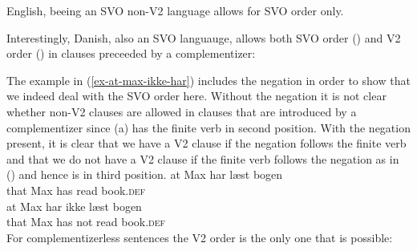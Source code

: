 
English, beeing an SVO non-V2 language allows for SVO order only.
\z

Interestingly, Danish, also an SVO languauge, allows both SVO order () and V2 order () in clauses
preceeded by a complementizer:
\z

\eal
{}
\zl
The example in (\ref{ex-at-max-ikke-har}) includes the negation in order to show that we indeed deal
with the SVO order here. Without the negation it is not clear whether non-V2 clauses are allowed in
clauses that are introduced by a complementizer since (a) has the finite verb in second
position. With the negation present, it is clear that we have a V2 clause if the negation follows
the finite verb and that we do not have a V2 clause if the finite verb follows the negation as in
() and hence is in third position.
\eal
\settowidth{}
\ex 
\gll at Max har læst bogen\\
     that Max has read book.\textsc{def}\\
\ex 
\gll at Max har ikke læst bogen\\
     that Max has not read book.\textsc{def}\\
\zl 
For complementizerless sentences the V2 order is the only one that is possible:
\eal
\settowidth{}
\zl 


